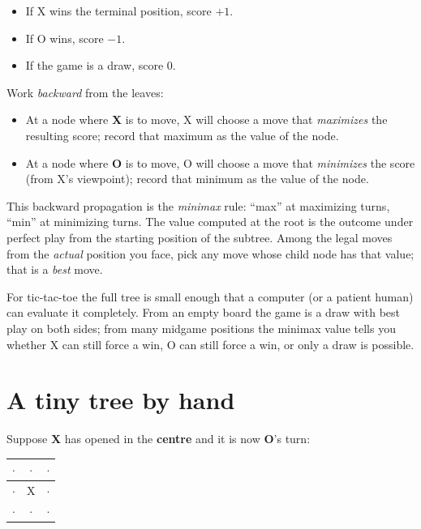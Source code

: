 \begin{itemize}
  \item If X wins the terminal position, score \(+1\).
  \item If O wins, score \(-1\).
  \item If the game is a draw, score \(0\).
\end{itemize}

Work \emph{backward} from the leaves:

\begin{itemize}
  \item At a node where \textbf{X} is to move, X will choose a move that
  \emph{maximizes} the resulting score; record that maximum as the value of the
  node.
  \item At a node where \textbf{O} is to move, O will choose a move that
  \emph{minimizes} the score (from X's viewpoint); record that minimum as the
  value of the node.
\end{itemize}

This backward propagation is the \emph{minimax} rule: ``max'' at maximizing
turns, ``min'' at minimizing turns. The value computed at the root is the
outcome under perfect play from the starting position of the subtree. Among the
legal moves from the \emph{actual} position you face, pick any move whose child
node has that value; that is a \emph{best} move.

For tic-tac-toe the full tree is small enough that a computer (or a patient
human) can evaluate it completely. From an empty board the game is a draw with
best play on both sides; from many midgame positions the minimax value tells
you whether X can still force a win, O can still force a win, or only a draw is
possible.

\section{A tiny tree by hand}
Suppose \textbf{X} has opened in the \textbf{centre} and it is now
\textbf{O}'s turn:

\begin{center}
\begin{tabular}{|c|c|c|}
\hline
\(\cdot\) & \(\cdot\) & \(\cdot\) \\
\hline
\(\cdot\) & X & \(\cdot\) \\
\hline
\(\cdot\) & \(\cdot\) & \(\cdot\) \\
\hline
\end{tabular}
\end{center}

